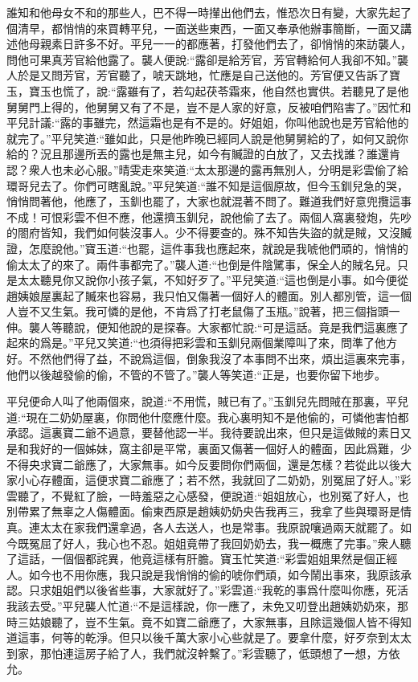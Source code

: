 \begin{parag}
    誰知和他母女不和的那些人，巴不得一時攆出他們去，惟恐次日有變，大家先起了個清早，都悄悄的來買轉平兒，一面送些東西，一面又奉承他辦事簡斷，一面又講述他母親素日許多不好。平兒一一的都應著，打發他們去了，卻悄悄的來訪襲人，問他可果真芳官給他露了。襲人便說:“露卻是給芳官，芳官轉給何人我卻不知。”襲人於是又問芳官，芳官聽了，唬天跳地，忙應是自己送他的。芳官便又告訴了寶玉，寶玉也慌了，說:“露雖有了，若勾起茯苓霜來，他自然也實供。若聽見了是他舅舅門上得的，他舅舅又有了不是，豈不是人家的好意，反被咱們陷害了。”因忙和平兒計議:“露的事雖完，然這霜也是有不是的。好姐姐，你叫他說也是芳官給他的就完了。”平兒笑道:“雖如此，只是他昨晚已經同人說是他舅舅給的了，如何又說你給的？況且那邊所丟的露也是無主兒，如今有贓證的白放了，又去找誰？誰還肯認？衆人也未必心服。”晴雯走來笑道:“太太那邊的露再無別人，分明是彩雲偷了給環哥兒去了。你們可瞎亂說。”平兒笑道:“誰不知是這個原故，但今玉釧兒急的哭，悄悄問著他，他應了，玉釧也罷了，大家也就混著不問了。難道我們好意兜攬這事不成！可恨彩雲不但不應，他還擠玉釧兒，說他偷了去了。兩個人窩裏發炮，先吵的閤府皆知，我們如何裝沒事人。少不得要查的。殊不知告失盜的就是賊，又沒贓證，怎麼說他。”寶玉道:“也罷，這件事我也應起來，就說是我唬他們頑的，悄悄的偷太太了的來了。兩件事都完了。”襲人道:“也倒是件陰騭事，保全人的賊名兒。只是太太聽見你又說你小孩子氣，不知好歹了。”平兒笑道:“這也倒是小事。如今便從趙姨娘屋裏起了贓來也容易，我只怕又傷著一個好人的體面。別人都別管，這一個人豈不又生氣。我可憐的是他，不肯爲了打老鼠傷了玉瓶。”說著，把三個指頭一伸。襲人等聽說，便知他說的是探春。大家都忙說:“可是這話。竟是我們這裏應了起來的爲是。”平兒又笑道:“也須得把彩雲和玉釧兒兩個業障叫了來，問準了他方好。不然他們得了益，不說爲這個，倒象我沒了本事問不出來，煩出這裏來完事，他們以後越發偷的偷，不管的不管了。”襲人等笑道:“正是，也要你留下地步。
\end{parag}


\begin{parag}
    平兒便命人叫了他兩個來，說道:“不用慌，賊已有了。”玉釧兒先問賊在那裏，平兒道:“現在二奶奶屋裏，你問他什麼應什麼。我心裏明知不是他偷的，可憐他害怕都承認。這裏寶二爺不過意，要替他認一半。我待要說出來，但只是這做賊的素日又是和我好的一個姊妹，窩主卻是平常，裏面又傷著一個好人的體面，因此爲難，少不得央求寶二爺應了，大家無事。如今反要問你們兩個，還是怎樣？若從此以後大家小心存體面，這便求寶二爺應了；若不然，我就回了二奶奶，別冤屈了好人。”彩雲聽了，不覺紅了臉，一時羞惡之心感發，便說道:“姐姐放心，也別冤了好人，也別帶累了無辜之人傷體面。偷東西原是趙姨奶奶央告我再三，我拿了些與環哥是情真。連太太在家我們還拿過，各人去送人，也是常事。我原說嚷過兩天就罷了。如今既冤屈了好人，我心也不忍。姐姐竟帶了我回奶奶去，我一概應了完事。”衆人聽了這話，一個個都詫異，他竟這樣有肝膽。寶玉忙笑道:“彩雲姐姐果然是個正經人。如今也不用你應，我只說是我悄悄的偷的唬你們頑，如今鬧出事來，我原該承認。只求姐姐們以後省些事，大家就好了。”彩雲道:“我乾的事爲什麼叫你應，死活我該去受。”平兒襲人忙道:“不是這樣說，你一應了，未免又叨登出趙姨奶奶來，那時三姑娘聽了，豈不生氣。竟不如寶二爺應了，大家無事，且除這幾個人皆不得知道這事，何等的乾淨。但只以後千萬大家小心些就是了。要拿什麼，好歹奈到太太到家，那怕連這房子給了人，我們就沒幹繫了。”彩雲聽了，低頭想了一想，方依允。
\end{parag}



